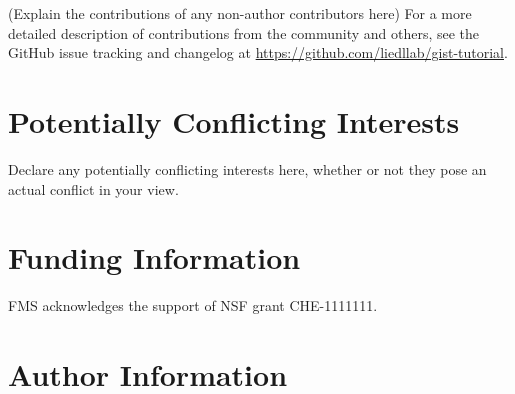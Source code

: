 \documentclass[9pt,tutorial]{livecoms}
\newcommand{\githubrepository}{\url{https://github.com/liedllab/gist-tutorial}}  %
\begin{document}
(Explain the contributions of any non-author contributors here)
For a more detailed description of contributions from the community and others, see the GitHub issue tracking and changelog at \githubrepository.

\section*{Potentially Conflicting Interests}

Declare any potentially conflicting interests here, whether or not they pose an actual conflict in your view.

\section*{Funding Information}
FMS acknowledges the support of NSF grant CHE-1111111.

\section*{Author Information}
\makeorcid




\end{document}
